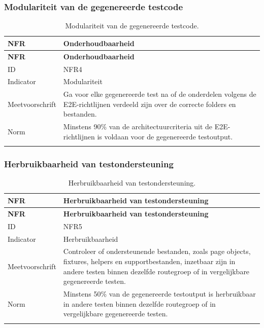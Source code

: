 \subsubsection{Modulariteit van de gegenereerde testcode}

\begin{longtable}{p{}p{}}
    \toprule
    \textbf{NFR} & \textbf{Onderhoudbaarheid} \\
    \midrule
    \endfirsthead
    
    \toprule
    \textbf{NFR} & \textbf{Onderhoudbaarheid} \\
    \midrule
    \endhead
    
    ID & NFR4 \\
    \midrule
    Indicator & Modulariteit \\
    \midrule
    Meetvoorschrift & Ga voor elke gegenereerde test na of de onderdelen volgens de E2E-richtlijnen verdeeld zijn over de correcte folders en bestanden. \\
    \midrule
    Norm & Minstens 90\% van de architectuurcriteria uit de E2E-richtlijnen is voldaan voor de gegenereerde testoutput. \\
    
    \bottomrule
    \caption[NFR4: modulariteit]{Modulariteit van de gegenereerde testcode.}
    \label{tab:nfr-modulariteit}
\end{longtable}

\subsubsection{Herbruikbaarheid van testondersteuning}

\begin{longtable}{p{}p{}}
    \toprule
    \textbf{NFR} & \textbf{Herbruikbaarheid van testondersteuning} \\
    \midrule
    \endfirsthead
    
    \toprule
    \textbf{NFR} & \textbf{Herbruikbaarheid van testondersteuning} \\
    \midrule
    \endhead
    
    ID & NFR5 \\
    \midrule
    Indicator & Herbruikbaarheid \\
    \midrule
    Meetvoorschrift & Controleer of ondersteunende bestanden, zoals page objects, fixtures, helpers en supportbestanden, inzetbaar zijn in andere testen binnen dezelfde routegroep of in vergelijkbare gegenereerde testen. \\
    \midrule
    Norm & Minstens 50\% van de gegenereerde testoutput is herbruikbaar in andere testen binnen dezelfde routegroep of in vergelijkbare gegenereerde testen. \\
    
    \bottomrule
    \caption[NFR5: herbruikbaarheid]{Herbruikbaarheid van testondersteuning.}
    \label{tab:nfr-herbruikbaarheid}
\end{longtable}

